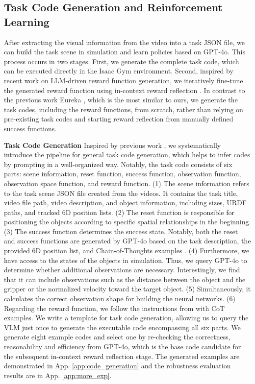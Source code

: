\subsection{Task Code Generation and Reinforcement Learning}
\label{sec:method:policy_learning}
After extracting the visual information from the video into a task JSON file, we can build the task scene in simulation and learn policies based on GPT-4o. This process occurs in two stages. First, we generate the complete task code, which can be executed directly in the Isaac Gym \citep{makoviychuk2021isaac} environment. Second, inspired by recent work on LLM-driven reward function generation, we iteratively fine-tune the generated reward function using in-context reward reflection \citep{shinn2023reflexion, ma2023eureka, wang2023voyager}. In contrast to the previous work Eureka \citep{ma2023eureka}, which is the most similar to ours, we generate the task codes, including the reward functions, from scratch, rather than relying on pre-existing task codes and starting reward reflection from manually defined success functions. 

\textbf{Task Code Generation} Inspired by previous work \citep{ma2023eureka, wang2023gensim, wang2023robogen}, we systematically introduce the pipeline for general task code generation, which helps to infer codes by prompting in a well-organized way. Notably, the task code consists of six parts: scene information, reset function, success function, observation function, observation space function, and reward function. (1) The scene information refers to the task scene JSON file created from the videos. It contains the task title, video file path, video description, and object information, including sizes, URDF paths, and tracked 6D position lists. (2) The reset function is responsible for positioning the objects according to specific spatial relationships in the beginning. 
(3) The success function determines the success state. Notably, both the reset and success functions are generated by GPT-4o based on the task description, the provided 6D position list, and Chain-of-Thoughts examples \citep{wei2022chain}. 
(4) Furthermore, we have access to the states of the objects in simulation. Thus, we query GPT-4o to determine whether additional observations are necessary. Interestingly, we find that it can include observations such as the distance between the object and the gripper or the normalized velocity toward the target object. 
(5) Simultaneously, it calculates the correct observation shape for building the neural networks. 
(6) Regarding the reward function, we follow the instructions from \cite{ma2023eureka} with CoT examples. We write a template for task code generation, allowing us to query the VLM just once to generate the executable code encompassing all six parts. 
We generate eight example codes and select one by re-checking the correctness, reasonability and efficiency from GPT-4o, which is the base code candidate for the subsequent in-context reward reflection stage. 
The generated examples are demonstrated in App. \ref{app:code_generation} and the robustness evaluation results are in App. \ref{app:more_exp}.

